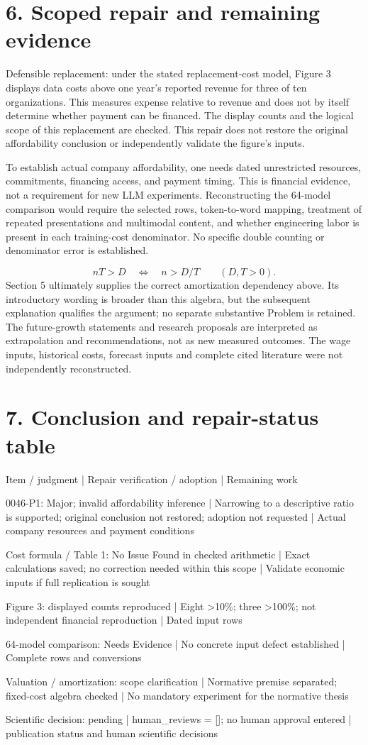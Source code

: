 \documentclass[10pt]{article}
\begin{document}
\section*{6. Scoped repair and remaining evidence}
Defensible replacement: under the stated replacement-cost model, Figure 3 displays data costs above one year’s reported revenue for three of ten organizations. This measures expense relative to revenue and does not by itself determine whether payment can be financed. The display counts and the logical scope of this replacement are checked. This repair does not restore the original affordability conclusion or independently validate the figure’s inputs.\par
To establish actual company affordability, one needs dated unrestricted resources, commitments, financing access, and payment timing. This is financial evidence, not a requirement for new LLM experiments. Reconstructing the 64-model comparison would require the selected rows, token-to-word mapping, treatment of repeated presentations and multimodal content, and whether engineering labor is present in each training-cost denominator. No specific double counting or denominator error is established.\par
\[nT>D\quad\Longleftrightarrow\quad n>D/T\qquad(D,T>0).\] Section 5 ultimately supplies the correct amortization dependency above. Its introductory wording is broader than this algebra, but the subsequent explanation qualifies the argument; no separate substantive Problem is retained. The future-growth statements and research proposals are interpreted as extrapolation and recommendations, not as new measured outcomes. The wage inputs, historical costs, forecast inputs and complete cited literature were not independently reconstructed.\par
\section*{7. Conclusion and repair-status table}
Item / judgment | Repair verification / adoption | Remaining work\par
0046-P1: Major; invalid affordability inference | Narrowing to a descriptive ratio is supported; original conclusion not restored; adoption not requested | Actual company resources and payment conditions\par
Cost formula / Table 1: No Issue Found in checked arithmetic | Exact calculations saved; no correction needed within this scope | Validate economic inputs if full replication is sought\par
Figure 3: displayed counts reproduced | Eight >10\%; three >100\%; not independent financial reproduction | Dated input rows\par
64-model comparison: Needs Evidence | No concrete input defect established | Complete rows and conversions\par
Valuation / amortization: scope clarification | Normative premise separated; fixed-cost algebra checked | No mandatory experiment for the normative thesis\par
Scientific decision: pending | human\_reviews = []; no human approval entered | publication status and human scientific decisions\par
\end{document}
